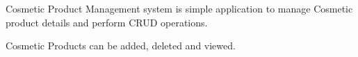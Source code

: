 
\begin{DoxyItemize}
\item Cosmetic Product Management system is simple application to manage Cosmetic product details and perform CRUD operations.
\item Cosmetic Products can be added, deleted and viewed. 
\end{DoxyItemize}